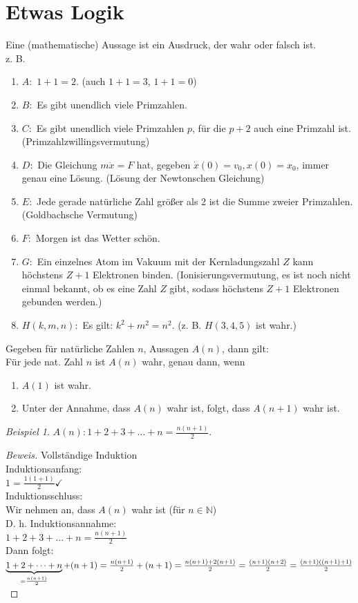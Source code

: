 \documentclass[12pt,a4paper,titlepage]{article} %
\theoremstyle{definition}
\theoremstyle{remark}
\newtheorem*{bsp}{Beispiel}
\newenvironment{bew}{\begin{proof}[Beweis]}{\end{proof}}
\newcommand{\gqq}[1]{\glqq{}#1\grqq{}}
\begin{document}
\section{Etwas Logik}
Eine (mathematische) Aussage ist ein Ausdruck, der wahr oder falsch ist.\\
z. B.
\begin{enumerate}
  \item \(A :\) \gqq{\(1+1=2\).}  (auch \gqq{\(1+1=3\)}, \gqq{\(1+1=0\)})
  \item \(B :\) \gqq{Es gibt unendlich viele Primzahlen.}
  \item \(C :\) \gqq{Es gibt unendlich viele Primzahlen \(p\), für die \(p + 2\) auch eine Primzahl ist.} (Primzahlzwillingsvermutung)
  \item \(D :\) \gqq{Die Gleichung \(m \ddot{x} = F\) hat, gegeben \(\dot{x}(0) = v_0, x(0) = x_0\), immer genau eine Lösung.} (Lösung der Newtonschen Gleichung)
  \item \(E :\) \gqq{Jede gerade natürliche Zahl größer als 2 ist die Summe zweier Primzahlen.} (Goldbachsche Vermutung)
  \item \(F :\) \gqq{Morgen ist das Wetter schön.}
  \item \(G :\) \gqq{Ein einzelnes Atom im Vakuum mit der Kernladungszahl \(Z\) kann höchstens \(Z+1\) Elektronen binden.} (Ionisierungsvermutung, es ist noch nicht einmal bekannt, ob es eine Zahl \(Z\) gibt, sodass höchstens \(Z+1\) Elektronen gebunden werden.)
  \item \(H(k,m,n) :\) \gqq{Es gilt: \(k^2 + m^2 = n^2\).} (z. B. \(H(3,4,5)\) ist wahr.)
\end{enumerate}
Gegeben für natürliche Zahlen \(n\), Aussagen \(A(n)\), dann gilt:\\
Für jede nat. Zahl \(n\) ist \(A(n)\) wahr, genau dann, wenn 
\begin{enumerate}
  \item \(A(1)\) ist wahr.
  \item Unter der Annahme, dass \(A(n)\) wahr ist, folgt, dass \(A(n+1)\) wahr ist.
\end{enumerate}
\begin{bsp}
	\(A(n): 1+2+3+\dots+n=\frac{n(n+1)}{2}\).
\end{bsp}
\begin{bew} 
	Vollständige Induktion\\
	Induktionsanfang:\\
	\(1 = \frac{1(1+1)}{2} \checkmark\)\\
	Induktionsschluss:\\
	Wir nehmen an, dass \(A(n)\) wahr ist (für \(n\in\mathbb{N}\))\\
	D. h. Induktionsannahme:\\
	\(1+2+3+\dots+n=\frac{n(n+1)}{2}\)\\
	Dann folgt:\\
	\(\underbrace{1+2+\dots+n}_{=\frac{n(n+1)}{2}}+(n+1)=\frac{n(n+1)}{2}+(n+1) \\
	=\frac{n(n+1) + 2(n+1)}{2} = \frac{(n+1)(n+2)}{2} = \frac{(n+1)((n+1)+1)}{2}\)
\end{bew}
\end{document}
